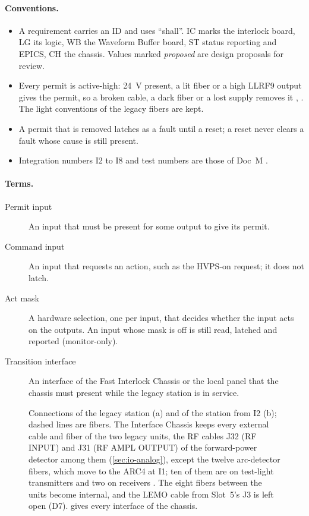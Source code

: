 \paragraph{Conventions.}
\begin{itemize}
\item A requirement carries an ID and uses ``shall''. IC marks the interlock board,
LG its logic, WB the Waveform Buffer board, ST status reporting and EPICS, CH
the chassis. Values marked \emph{proposed} are design proposals for review.
\item Every permit is active-high: \qty{24}{\volt} present, a lit fiber or a high
LLRF9 output gives the permit, so a broken cable, a dark fiber or a lost supply
removes it , . The light conventions of the legacy fibers are kept.
\item A permit that is removed latches as a fault until a reset; a reset never clears
a fault whose cause is still present.
\item Integration numbers I2 to I8 and test numbers are those of Doc~M .
\end{itemize}

\paragraph{Terms.}
\begin{description}
\item[Permit input] An input that must be present for some output to give its
permit.
\item[Command input] An input that requests an action, such as the HVPS-on request; it
does not latch.
\item[Act mask] A hardware selection, one per input, that decides whether the input
acts on the outputs. An input whose mask is off is still read, latched and reported
(monitor-only).
\item[Transition interface] An interface of the Fast Interlock Chassis or the local panel
that the chassis must present while the legacy station is in service.
\end{description}

\begin{figure}[H]
\centering
\begin{fitpicture}

\end{fitpicture}
\caption[Connections of the legacy station and of the station from I2.]{Connections of
the legacy station (a) and of the station from I2 (b); dashed lines are fibers. The
Interface Chassis keeps every external cable and fiber of the two legacy units, the RF
cables J32 (RF INPUT) and J31 (RF AMPL OUTPUT) of the forward-power detector among
them (\cref{sec:io-analog}), except the twelve arc-detector fibers, which move to the
ARC4 at I1; ten of them are on test-light transmitters and two on receivers . The
eight fibers between the units become internal, and the LEMO cable from Slot~5's J3
is left open (D7).  gives every interface of the
chassis.}\label{fig:stations}
\end{figure}

